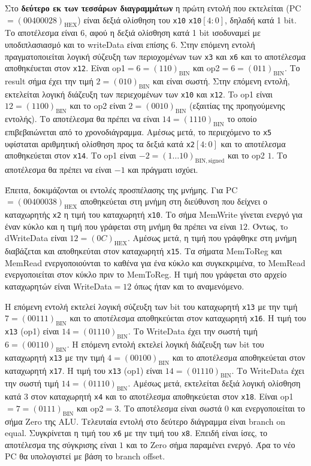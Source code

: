 Στο \textbf{δεύτερο εκ των τεσσάρων διαγραμμάτων} η πρώτη εντολή που εκτελείται (PC$=(00400028)_\mathrm{HEX}$) είναι δεξιά ολίσθηση του \texttt{x10} \texttt{x10}$[4:0]$, δηλαδή κατά 1 bit. Το αποτέλεσμα είναι $6$, αφού η δεξιά ολίσθηση κατά 1 bit ισοδυναμεί με υποδιπλασιασμό και το writeData είναι επίσης $6$. Στην επόμενη εντολή πραγματοποιείται λογική σύζευξη των περιοχομένων των \texttt{x3} και \texttt{x6} και το αποτέλεσμα αποθηκέυεται στον \texttt{x12}. Είναι op1$=6=(110)_\mathrm{BIN}$ και op2$=6=(011)_\mathrm{BIN}$. Το result σήμα έχει την τιμή $2=(010)_\mathrm{BIN}$ και είναι σωστή. Στην επόμενη εντολή, εκτελείται λογική διάζευξη των περιεχομένων των \texttt{x10} και \texttt{x12}. To op1 είναι $12=(1100)_\mathrm{BIN}$ και το op2 είναι $2=(0010)_\mathrm{BIN}$ (εξαιτίας της προηγούμενης εντολής). Το αποτέλεσμα θα πρέπει να είναι $14=(1110)_\mathrm{BIN}$ το οποίο επιβεβαιώνεται από το χρονοδιάγραμμα. Αμέσως μετά, το περιεχόμενο το \texttt{x5} υφίσταται αριθμητική ολίσθηση προς τα δεξιά κατά \texttt{x2}$[4:0]$ και το αποτέλεσμα αποθηκεύεται στον \texttt{x14}. Το op1 είναι $-2=(1\ldots10)_\mathrm{BIN,signed}$ και το op2 $1$. Το αποτέλεσμα θα πρέπει να είναι $-1$ και πράγματι ισχύει.\par
Έπειτα, δοκιμάζονται οι εντολές προσπέλασης της μνήμης. Για PC$=(00400038)_\mathrm{HEX}$ αποθηκεύεται στη μνήμη στη διεύθυνση που δείχνει ο καταχωρητής \texttt{x2} η τιμή του καταχωρητή \texttt{x10}. Το σήμα MemWrite γίνεται ενεργό για έναν κύκλο και η τιμή που γράφεται στη μνήμη θα πρέπει να είναι $12$. Όντως, τo dWriteData είναι $12=(0C)_\mathrm{HEX}$. Αμέσως μετά, η τιμή που γράφθηκε στη μνήμη διαβάζεται και αποθηκεύται στον καταχωρητή \texttt{x15}. Tα σήματα MemToReg και MemRead ενεργοποιούνται το καθένα για ένα κύκλο και συγκεκριμένα, το MemRead ενεργοποιείται στον κύκλο πριν το MemToReg. Η τιμή που γράφεται στο αρχείο καταχωρητών είναι WriteData$=12$ όπως ήταν και το αναμενόμενο.\par
Η επόμενη εντολή εκτελεί λογική σύζευξη των bit του καταχωρητή \texttt{x13} με την τιμή $7=(00111)_\mathrm{BIN}$ και το αποτέλεσμα αποθηκεύεται στον καταχωρητή \texttt{x16}. Η τιμή του \texttt{x13} (op1) είναι $14=(01110)_\mathrm{BIN}$. Το WriteData έχει την σωστή τιμή $6=(00110)_\mathrm{BIN}$. Η επόμενη εντολή εκτελεί λογική διάζευξη των bit του καταχωρητή \texttt{x13} με την τιμή $4=(00100)_\mathrm{BIN}$ και το αποτέλεσμα αποθηκεύεται στον καταχωρητή \texttt{x17}. Η τιμή του \texttt{x13} (op1) είναι $14=(01110)_\mathrm{BIN}$. Το WriteData έχει την σωστή τιμή $14=(01110)_\mathrm{BIN}$. Αμέσως μετά, εκτελείται δεξιά λογική ολίσθηση κατά 3 στον καταχωρητή \texttt{x4} και το αποτέλεσμα αποθηκεύεται στον \texttt{x18}. Είναι op1$=7=(0111)_\mathrm{BIN}$ και op2$=3$. Το αποτέλεσμα είναι σωστά $0$ και ενεργοποιείται το σήμα Zero της ALU. Τελευταία εντολή στο δεύτερο διάγραμμα είναι branch on equal. Συγκρίνεται η τιμή του \texttt{x6} με την τιμή του \texttt{x8}. Επειδή είναι ίσες, το αποτέλεσμα της σύγκρισης είναι $1$ και το Zero σήμα παραμένει ενεργό. Άρα το νέο PC θα υπολογιστεί με βάση το branch offset.\par
